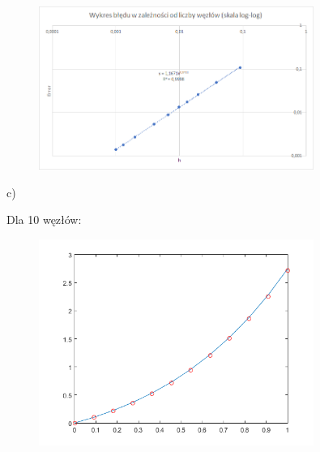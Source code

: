 \begin{samepage}
	
	\begin{figure}[!ht]
		\begin{center}
			\includegraphics[width=0.8\textwidth]{Lab4/charts/zad4/2/error.png}
		\end{center}
	\end{figure}
	\FloatBarrier
\end{samepage} 

\newpage

c)\\
\begin{samepage}
	Dla 10 węzłów:
	
	
	\FloatBarrier
	\begin{figure}[!ht]
		\begin{center}
			\includegraphics[width=0.8\textwidth]{Lab4/charts/zad4/3/10.png}
		\end{center}
	\end{figure}
	\FloatBarrier
\end{samepage}

